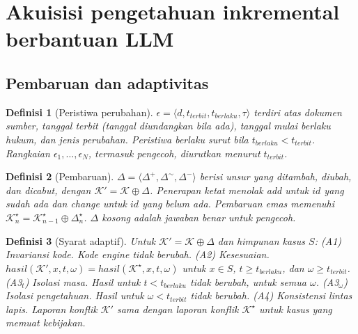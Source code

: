\documentclass[journal,a4paper]{IEEEtran}
\makeatletter
\DeclareRobustCommand{\en}[1]{{\usefont{\f@encoding}{\f@family}{\f@series}{it}#1\/}}
\newtheorem{definisi}{Definisi}
\newcommand{\K}{\mathcal{K}}
\newcommand{\hasil}{\mathit{hasil}}
\newcommand{\emas}{\star}
\makeatother
\begin{document}
\section{Akuisisi pengetahuan inkremental berbantuan LLM}
\label{sec:akuisisi}
\subsection{Pembaruan dan adaptivitas}
\label{subsec:adaptif}

\begin{definisi}[Peristiwa perubahan]
\label{def:peristiwa}
$\epsilon = \langle d, t_{\mathit{terbit}}, t_{\mathit{berlaku}}, \tau \rangle$ terdiri atas dokumen sumber, tanggal terbit (tanggal diundangkan bila ada), tanggal mulai berlaku hukum, dan jenis perubahan. Peristiwa berlaku surut bila $t_{\mathit{berlaku}} < t_{\mathit{terbit}}$. Rangkaian $\epsilon_1, \dots, \epsilon_N$, termasuk pengecoh, diurutkan menurut $t_{\mathit{terbit}}$.
\end{definisi}

\begin{definisi}[Pembaruan]
\label{def:pembaruan}
$\Delta = \langle \Delta^{+}, \Delta^{\sim}, \Delta^{-} \rangle$ berisi unsur yang ditambah, diubah, dan dicabut, dengan $\K' = \K \oplus \Delta$. Penerapan ketat menolak \en{add} untuk $\mathit{id}$ yang sudah ada dan \en{change} untuk $\mathit{id}$ yang belum ada. Pembaruan emas memenuhi $\K^{\emas}_n = \K^{\emas}_{n-1} \oplus \Delta^{\emas}_n$. $\Delta$ kosong adalah jawaban benar untuk pengecoh.
\end{definisi}

\begin{definisi}[Syarat adaptif]
\label{def:syarat}
Untuk $\K' = \K \oplus \Delta$ dan himpunan kasus $S$:
(A1) Invariansi kode. Kode \en{engine} tidak berubah.
(A2) Kesesuaian. $\hasil(\K', x, t, \omega) = \hasil(\K^{\emas}, x, t, \omega)$ untuk $x \in S$, $t \geq t_{\mathit{berlaku}}$, dan $\omega \geq t_{\mathit{terbit}}$.
(A3$_t$) Isolasi masa. Hasil untuk $t < t_{\mathit{berlaku}}$ tidak berubah, untuk semua $\omega$.
(A3$_\omega$) Isolasi pengetahuan. Hasil untuk $\omega < t_{\mathit{terbit}}$ tidak berubah.
(A4) Konsistensi lintas lapis. Laporan konflik $\K'$ sama dengan laporan konflik $\K^{\emas}$ untuk kasus yang memuat kebijakan.
\end{definisi}
\end{document}
